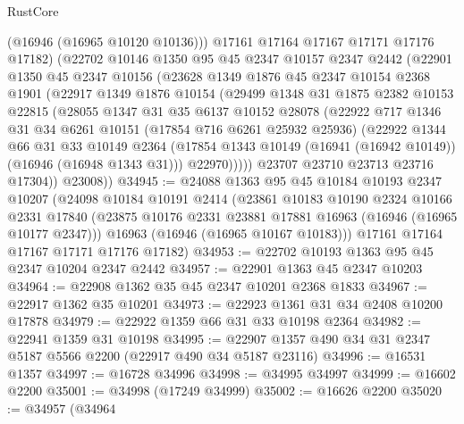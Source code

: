 \begin{lexlean}{RustCore}
\begin{coremodule}
          (@16946 (@16965 @10120 @10136)))
        @17161
        @17164
        @17167
        @17171
        @17176
        @17182)
      (@22702
        @10146
        @1350
        @95
        @45
        @2347
        @10157
        @2347
        @2442
        (@22901
          @1350
          @45
          @2347
          @10156
          (@23628
            @1349
            @1876
            @45
            @2347
            @10154
            @2368
            @1901
            (@22917
              @1349
              @1876
              @10154
              (@29499
                @1348
                @31
                @1875
                @2382
                @10153
                @22815
                (@28055
                  @1347
                  @31
                  @35
                  @6137
                  @10152
                  @28078
                  (@22922
                    @717
                    @1346
                    @31
                    @34
                    @6261
                    @10151
                    (@17854 @716 @6261 @25932 @25936)
                    (@22922
                      @1344
                      @66
                      @31
                      @33
                      @10149
                      @2364
                      (@17854 @1343 @10149 (@16941 (@16942 @10149)) (@16946 (@16948 @1343 @31)))
                      @22970)))))
            @23707
            @23710
            @23713
            @23716
            @17304))
        @23008))
@34945 := @24088
    @1363
    @95
    @45
    @10184
    @10193
    @2347
    @10207
    (@24098
      @10184
      @10191
      @2414
      (@23861
        @10183
        @10190
        @2324
        @10166
        @2331
        @17840
        (@23875 @10176 @2331 @23881 @17881 @16963 (@16946 (@16965 @10177 @2347)))
        @16963
        (@16946 (@16965 @10167 @10183)))
      @17161
      @17164
      @17167
      @17171
      @17176
      @17182)
@34953 := @22702 @10193 @1363 @95 @45 @2347 @10204 @2347 @2442
@34957 := @22901 @1363 @45 @2347 @10203
@34964 := @22908 @1362 @35 @45 @2347 @10201 @2368 @1833
@34967 := @22917 @1362 @35 @10201
@34973 := @22923 @1361 @31 @34 @2408 @10200 @17878
@34979 := @22922 @1359 @66 @31 @33 @10198 @2364
@34982 := @22941 @1359 @31 @10198
@34995 := @22907 @1357 @490 @34 @31 @2347 @5187 @5566 @2200 (@22917 @490 @34 @5187 @23116)
@34996 := @16531 @1357
@34997 := @16728 @34996
@34998 := @34995 @34997
@34999 := @16602 @2200
@35001 := @34998 (@17249 @34999)
@35002 := @16626 @2200
@35020 := @34957
    (@34964

\end{coremodule}
\end{lexlean}

